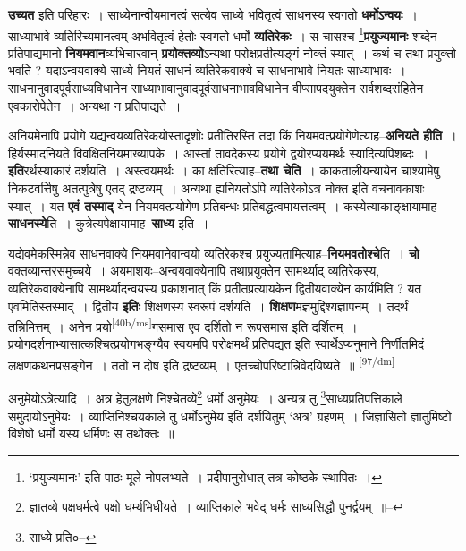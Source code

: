 \documentclass[article,12pt,a4paper]{memoir}
\begin{document}
	  \pstart \textbf{उच्यत} इति परिहारः । साध्येनान्वीयमानत्वं सत्येव साध्ये भवितृत्वं साधनस्य स्वगतो \textbf{धर्मोऽन्वयः} । साध्याभावे व्यतिरिच्यमानत्वम् अभवितृत्वं हेतोः स्वगतो धर्मो \textbf{व्यतिरेकः} । स चासश्च \footnote{‘प्रयुज्यमानः’ इति पाठः मूले नोपलभ्यते । प्रदीपानुरोधात् तत्र कोष्ठके स्थापितः ।}\textbf{प्रयुज्यमानः} शब्देन प्रतिपाद्यमानो \textbf{नियमवान}व्यभिचारवान् \textbf{प्रयोक्तव्यो}ऽन्यथा परोक्षप्रतीत्यङ्गं नोक्तं स्यात् । कथं च तथा प्रयुक्तो भवति ? यदाऽन्वयवाक्ये साध्ये नियतं साधनं व्यतिरेकवाक्ये च साधनाभावे नियतः साध्याभावः । साधनानुवादपूर्वसाध्यविधानेन साध्याभावानुवादपूर्वसाधनाभावविधानेन वीप्सापदयुक्तेन सर्वशब्दसंहितेन एवकारोपेतेन । अन्यथा न प्रतिपाद्यते ।
	\pend
      

	  \pstart अनियमेनापि प्रयोगे यद्यन्वयव्यतिरेकयोस्तादृशोः प्रतीतिरस्ति तदा किं नियमवत्प्रयोगेणेत्याह--\textbf{अनियते हीति} । हिर्यस्मादनियते विवक्षितनियमाख्यापके । आस्तां तावदेकस्य प्रयोगे द्वयोरप्ययमर्थः स्यादित्यपिशब्दः । \textbf{इति}रर्थस्याकारं दर्शयति । अस्त्वयमर्थः । का क्षतिरित्याह--\textbf{तथा चेति} । काकतालीयन्यायेन चाश्यामेषु निकटवर्त्तिषु अतत्पुत्रेषु एतद् द्रष्टव्यम् । अन्यथा ह्यनियतोऽपि व्यतिरेकोऽत्र नोक्त इति वचनावकाशः स्यात् । यत \textbf{एवं तस्माद्} येन नियमवत्प्रयोगेण प्रतिबन्धः प्रतिबद्धत्वमायत्तत्वम् । कस्येत्याकाङ्क्षायामाह—\textbf{साधनस्ये}ति । कुत्रेत्यपेक्षायामाह--\textbf{साध्य} इति ।
	\pend
      

	  \pstart यद्येवमेकस्मिन्नेव साधनवाक्ये नियमवानेवान्वयो व्यतिरेकश्च प्रयुज्यतामित्याह--\textbf{नियमवतोश्चे}ति । \textbf{चो} वक्तव्यान्तरसमुच्चये । अयमाशयः--अन्वयवाक्येनापि तथाप्रयुक्तेन सामर्थ्याद् व्यतिरेकस्य, व्यतिरेकवाक्येनापि सामर्थ्यादन्वयस्य प्रकाशनात् किं प्रतीतप्रत्यायकेन द्वितीयवाक्येन कार्यमिति ? यत एवमितिस्तस्माद् । द्वितीय \textbf{इतिः} शिक्षणस्य स्वरूपं दर्शयति । \textbf{शिक्षण}मज्ञमुद्दिश्यज्ञापनम् । तदर्थं तन्निमित्तम् । अनेन प्रयो\leavevmode\textsuperscript{\rmlatinfont\tiny [40b/ms]}गसमास एव दर्शितो न रूपसमास इति दर्शितम् । प्रयोगदर्शनाभ्यासात्कश्चित्प्रयोगभङ्ग्यैव स्वयमपि परोक्षमर्थं प्रतिपद्यत इति स्वार्थेऽप्यनुमाने निर्णीतमिदं लक्षणकथनप्रसङ्गेन । ततो न दोष इति द्रष्टव्यम् । एतच्चोपरिष्टान्निवेदयिष्यते ॥
	\pend
      \leavevmode\textsuperscript{\rmlatinfont\tiny [97/dm]}

	  \pstart अनुमेयोऽत्रेत्यादि । अत्र हेतुलक्षणे निश्चेतव्ये\footnote{ज्ञातव्ये पक्षधर्मत्वे पक्षो धर्म्यभिधीयते । व्याप्तिकाले भवेद् धर्मः साध्यसिद्धौ पुनर्द्वयम् ॥--\cite{dp-msD-n}} धर्मो अनुमेयः । अन्यत्र तु \footnote{साध्ये प्रति०--\cite{dp-msC}}साध्यप्रतिपत्तिकाले समुदायोऽनुमेयः । व्याप्तिनिश्चयकाले तु धर्मोऽनुमेय इति दर्शयितुम् ‘अत्र’ ग्रहणम् । जिज्ञासितो ज्ञातुमिष्टो विशेषो धर्मो यस्य धर्मिणः स तथोक्तः ॥
	\pend
       
\end{document}
